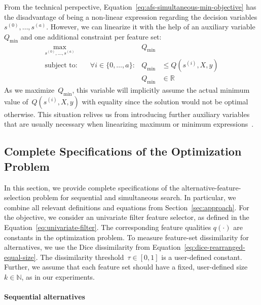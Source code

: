 \documentclass{article}
\theoremstyle{definition}
\begin{document}
From the technical perspective, Equation~\ref{eq:afs-simultaneous-min-objective} has the disadvantage of being a non-linear expression regarding the decision variables $s^{(0)}, \dots, s^{(a)}$.
However, we can linearize it with the help of an auxiliary variable~$Q_{\text{min}}$ and one additional constraint per feature set:
%
\begin{equation}
	\begin{aligned}
		\max_{s^{(0)}, \dots, s^{(a)}} &\quad &Q_{\text{min}} & \\
		\text{subject to:} &\quad \forall i \in \{0, \dots, a\} : &Q_{\text{min}} &\leq Q(s^{(i)},X,y) \\
		&\quad & Q_{\text{min}} &\in \mathbb{R}
	\end{aligned}
	\label{eq:afs-simultaneous-min-objective-linear}
\end{equation}
%
As we maximize~$Q_{\text{min}}$, this variable will implicitly assume the actual minimum value of~$Q(s^{(i)},X,y)$ with equality since the solution would not be optimal otherwise.
This situation relives us from introducing further auxiliary variables that are usually necessary when linearizing maximum or minimum expressions~\cite{mosek2022modeling}.

\subsection{Complete Specifications of the Optimization Problem}
\label{sec:appendix:complete-optimization-problem}

In this section, we provide complete specifications of the alternative-feature-selection problem for sequential and simultaneous search.
In particular, we combine all relevant definitions and equations from Section~\ref{sec:approach}.
For the objective, we consider an univariate filter feature selector, as defined in the Equation~\ref{eq:univariate-filter}.
The corresponding feature qualities $q(\cdot)$ are constants in the optimization problem.
To measure feature-set dissimilarity for alternatives, we use the Dice dissimilarity from Equation~\ref{eq:dice-rearranged-equal-size}.
The dissimilarity threshold~$\tau \in [0,1]$ is a user-defined constant.
Further, we assume that each feature set should have a fixed, user-defined size~$k \in \mathbb{N}$, as in our experiments.

\paragraph{Sequential alternatives}
\end{document}
